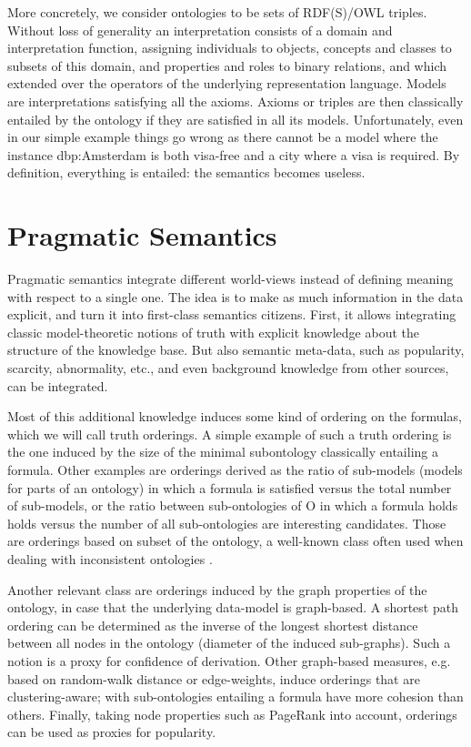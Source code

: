 \documentclass[letterpaper]{article}
\begin{document}
More concretely, we consider ontologies to be sets of RDF(S)/OWL triples. Without loss of generality an interpretation consists of a domain and interpretation function, assigning individuals to objects, concepts and classes to subsets of this domain, and properties and roles to binary relations, and which extended over the operators of the underlying representation language. Models are interpretations satisfying all the axioms. Axioms or triples are then classically entailed by the ontology if they are satisfied in all its models. Unfortunately, even in our simple example things go wrong as there cannot be a model where the instance dbp:Amsterdam is both visa-free and a city where a visa is required. By definition, everything is entailed: the semantics becomes useless.

\section{Pragmatic Semantics}

Pragmatic semantics integrate different world-views instead of defining meaning with respect to a single one. The idea is to make as much information in the data explicit, and turn it into first-class semantics citizens. First, it allows integrating classic model-theoretic notions of truth with explicit knowledge about the structure of the knowledge base. But also semantic meta-data, such as popularity, scarcity, abnormality, etc., and even background knowledge from other sources, can be integrated.

Most of this additional knowledge induces some kind of ordering on the formulas, which we will call truth orderings. A simple example of such a truth ordering is the one induced by the size of the minimal subontology classically entailing a formula. Other examples are orderings derived as the ratio of sub-models (models for parts of an ontology) in which a formula is satisfied versus the total number of sub-models, or the ratio between sub-ontologies of O in which a formula holds holds versus the number of all sub-ontologies are interesting candidates. Those are orderings based on subset of the ontology, a well-known class often used when dealing with inconsistent ontologies \cite{Huang}.

Another relevant class are orderings induced by the graph properties of the ontology, in case that the underlying data-model is graph-based. A shortest path ordering can be determined as the inverse of the longest shortest distance between all nodes in the ontology (diameter of the induced sub-graphs). Such a notion is a proxy for confidence of derivation. Other graph-based measures, e.g. based on random-walk distance or edge-weights, induce orderings that are clustering-aware; with sub-ontologies entailing a formula have more cohesion than others. Finally, taking node properties such as PageRank into account, orderings can be used as proxies for popularity.
\end{document}
